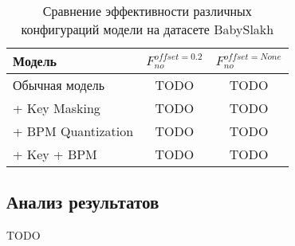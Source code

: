 \documentclass[a4paper, 12pt]{article} %
\begin{document}
\begin{table}[h!]
\centering
\begin{tabular}{|l|c|c|}
\hline
Модель & $F_{no}^{offset=0.2}$  & $F_{no}^{offset=None}$  \\ \hline
Обычная модель & TODO & TODO \\ 
+ Key Masking & TODO & TODO \\ 
+ BPM Quantization & TODO & TODO \\ 
+ Key + BPM & TODO & TODO \\ \hline
\end{tabular}
\caption{Сравнение эффективности различных конфигураций модели на датасете BabySlakh}
\label{table:results}
\end{table}

\subsection{Анализ результатов}

TODO



\end{document}
